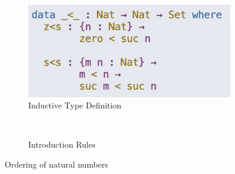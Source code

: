 \begin{figure}[ht]
	\begin{subfigure}{.45\textwidth}
		\includegraphics[scale=0.75,valign=t]{imgs/naturals-ordering.png}%
		\caption{Inductive Type Definition}
	\end{subfigure}
	\begin{subfigure}{.45\textwidth}
		\begin{mathpar}
			\\
		\end{mathpar}
		\caption{Introduction Rules}
	\end{subfigure}
	\caption{Ordering of natural numbers}
	\label{fig:naturals-ordering}
\end{figure}